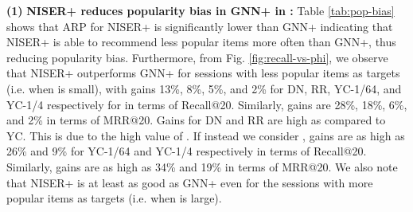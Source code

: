 \documentclass[sigconf]{acmart}
\begin{document}
				\begin{table}
					
\caption{Ablation results for NISER+ indicating that normalization of embeddings (L norm) contributes the most to performance improvement. Here PE: Position Embeddings. \label{tab:gnn_plus_ablation_recall}}
						\vspace{-2mm}
					\end{table}
					
					\textbf{(1)} \textbf{NISER+ reduces popularity bias in GNN+ in :} 
					Table \ref{tab:pop-bias} shows that ARP for NISER+ is significantly lower than GNN+ indicating that NISER+ is able to recommend less popular items more often than GNN+, thus reducing popularity bias.
					Furthermore, from Fig. \ref{fig:recall-vs-phi}, we observe that NISER+ outperforms GNN+ for sessions with less popular items as targets (i.e. when  is small), with gains 13\%, 8\%, 5\%, and 2\% for DN, RR, YC-1/64, and YC-1/4 respectively for  in terms of Recall@20. Similarly, gains are 28\%, 18\%, 6\%, and 2\% in terms of MRR@20.
					Gains for DN and RR are high as compared to YC. This is due to the high value of . If instead we consider , gains are as high as 26\% and 9\% for YC-1/64 and YC-1/4 respectively in terms of Recall@20. Similarly, gains are as high as 34\% and 19\% in terms of MRR@20.
					We also note that NISER+ is at least as good as GNN+ even for the sessions with more popular items as targets (i.e. when  is large). 
					
\end{document}
